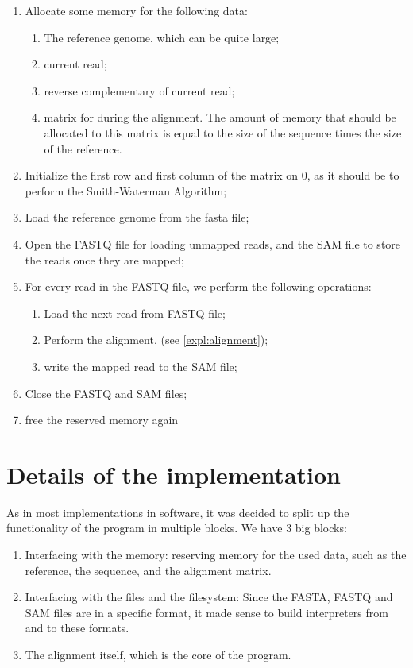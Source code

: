 \begin{enumerate}
	\item Allocate some memory for the following data:
	\begin{enumerate}
		\item The reference genome, which can be quite large;
		\item current read;
		\item reverse complementary of current read;
		\item matrix for during the alignment. The amount of memory that should be allocated to this matrix is equal to the size of the sequence times the size of the reference.
	\end{enumerate}
	\item Initialize the first row and first column of the matrix on $0$, as it should be to perform the Smith-Waterman Algorithm;
	\item Load the reference genome from the fasta file;
	\item Open the FASTQ file for loading unmapped reads, and the SAM file to store the reads once they are mapped;
	\item For every read in the FASTQ file, we perform the following operations:
	\begin{enumerate}
		\item Load the next read from FASTQ file;
		\item Perform the alignment. (see \ref{expl:alignment});
		\item write the mapped read to the SAM file;
	\end{enumerate}
	\item Close the FASTQ and SAM files;
	\item free the reserved memory again
\end{enumerate}

\section{Details of the implementation}

As in most implementations in software, it was decided to split up the functionality of the program in multiple blocks. We have 3 big blocks:
\begin{enumerate}
	\item Interfacing with the memory: reserving memory for the used data, such as the reference, the sequence, and the alignment matrix.
	\item Interfacing with the files and the filesystem: Since the FASTA, FASTQ and SAM files are in a specific format, it made sense to build interpreters from and to these formats. 
	\item The alignment itself, which is the core of the program.
\end{enumerate}

